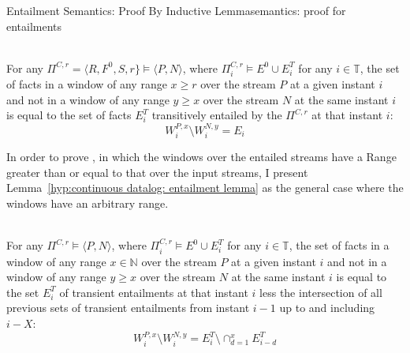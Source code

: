 \begin{nestedsection}{Entailment Semantics: Proof By Inductive Lemma}{semantics: proof for entailments}
	\begin{thrm} \hfill \\
		For any ${\Pi^{C,r} = \langle R, F^0, S, r\} \models \langle P, N \rangle}$, where ${\Pi^{C,r}_{i} \models E^0 \cup E^T_{i}}$ for any ${i \in \mathbb{T}}$, the set of facts in a window of any range ${x \geq r}$ over the stream $P$ at a given instant ${i}$ and not in a window of any range ${y \geq x}$ over the stream $N$ at the same instant $i$ is equal to the set of facts $E^T_{i}$ transitively entailed by the ${\Pi^{C,r}}$ at that instant $i$:
		\begin{equation*}
			W^{P,x}_{i} \setminus W^{N,y}_{i} = E_{i}
		\end{equation*}
	\end{thrm}
	In order to prove , in which the windows over the entailed streams have a Range greater than or equal to that over the input streams, I present Lemma~\ref{hyp:continuous datalog: entailment lemma} as the general case where the windows have an arbitrary range.
	\begin{lem}\label{hyp:continuous datalog: entailment lemma} \hfill \\
		For any ${\Pi^{C,r} \models \langle P,N \rangle}$, where ${\Pi^{C,r}_{i} \models E^0 \cup E^T_i}$ for any ${i \in \mathbb{T}}$, the set of facts in a window of any range ${x \in \mathbb{N}}$ over the stream $P$ at a given instant ${i}$ and not in a window of any range ${y \geq x}$ over the stream $N$ at the same instant $i$ is equal to the set $E^T_i$ of transient entailments at that instant $i$ less the intersection of all previous sets of transient entailments from instant ${i-1}$ up to and including ${i-X}$:
		\begin{equation*}
			W^{P,x}_{i} \setminus W^{N,y}_{i} = E^T_{i} \setminus \mathop{\cap}^{x}_{d=1} E^T_{i-d}
		\end{equation*}
	\end{lem}


\end{nestedsection}

